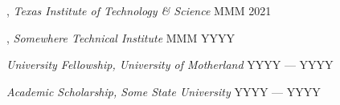 
, \textit{Texas Institute of Technology \& Science}	\hfill MMM 2021

, \textit{Somewhere Technical Institute} \hfill	MMM YYYY

\textit{University Fellowship, University of Motherland} 	\hfill YYYY --- YYYY

\textit{Academic Scholarship, Some State University} \hfill	YYYY --- YYYY


